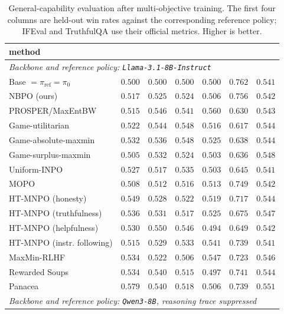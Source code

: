 \documentclass{article}
\theoremstyle{remark}
\theoremstyle{plain}
\newcommand{\piref}{\pi_{\mathrm{ref}}}
\newcommand{\NBPO}{\textsc{NBPO}}
\begin{document}
\begin{table}[t]
\centering\scriptsize
\setlength{\tabcolsep}{1.6pt}
\caption{General-capability evaluation after multi-objective training. The first four columns are held-out win rates against the corresponding reference policy; IFEval and TruthfulQA use their official metrics. Higher is better.}
\label{tab:general-benchmark-completion}
\begin{tabular}{lrrrrrr}
\toprule
method &  &  &  &  &  & \\
\midrule
\multicolumn{7}{l}{\textit{Backbone and reference policy: \texttt{Llama-3.1-8B-Instruct}}}\\
Base $=\piref=\pi_0$ & $0.500$ & $0.500$ & $0.500$ & $0.500$ & $\mathbf{0.762}$ & $0.541$\\
\NBPO{} (ours) & $0.517$ & $0.525$ & $0.524$ & $0.506$ & $0.756$ & $0.542$\\
PROSPER/MaxEntBW & $0.515$ & $0.546$ & $0.541$ & $\mathbf{0.560}$ & $0.630$ & $0.543$\\
Game-utilitarian & $0.522$ & $0.544$ & $\mathbf{0.548}$ & $0.516$ & $0.617$ & $0.544$\\
Game-absolute-maxmin & $0.532$ & $0.536$ & $\mathbf{0.548}$ & $0.525$ & $0.638$ & $0.544$\\
Game-surplus-maxmin & $0.505$ & $0.532$ & $0.524$ & $0.503$ & $0.636$ & $0.548$\\
Uniform-INPO & $0.527$ & $0.517$ & $0.535$ & $0.503$ & $0.645$ & $0.541$\\
MOPO & $0.508$ & $0.512$ & $0.516$ & $0.513$ & $0.749$ & $0.542$\\
HT-MNPO (honesty) & $0.549$ & $0.528$ & $0.522$ & $0.519$ & $0.717$ & $0.544$\\
HT-MNPO (truthfulness) & $0.536$ & $0.531$ & $0.517$ & $0.525$ & $0.675$ & $0.547$\\
HT-MNPO (helpfulness) & $0.530$ & $\mathbf{0.550}$ & $0.546$ & $0.494$ & $0.649$ & $0.542$\\
HT-MNPO (instr. following) & $0.515$ & $0.529$ & $0.533$ & $0.541$ & $0.739$ & $0.541$\\
\addlinespace
MaxMin-RLHF & $0.534$ & $0.522$ & $0.506$ & $0.547$ & $0.723$ & $0.546$\\
Rewarded Soups & $0.534$ & $0.540$ & $0.515$ & $0.497$ & $0.741$ & $0.544$\\
Panacea & $\mathbf{0.579}$ & $0.540$ & $0.518$ & $0.506$ & $0.739$ & $\mathbf{0.551}$\\
\midrule
\multicolumn{7}{l}{\textit{Backbone and reference policy: \texttt{Qwen3-8B}, reasoning trace suppressed}}\\

\end{tabular}
\end{table}
\end{document}
